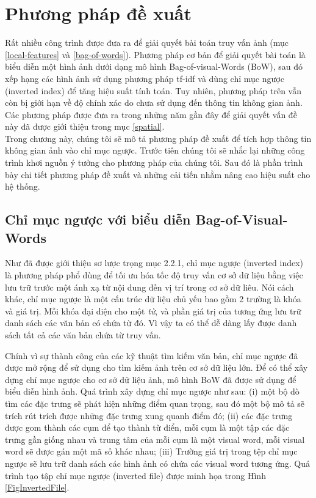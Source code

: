\chapter{Phương pháp đề xuất}
\label{chapter:proposed}
\ifpdf
    \graphicspath{{Chapter3/Chapter3Figs/PNG/}{Chapter3/Chapter3Figs/PDF/}{Chapter3/Chapter3Figs/}}
\else
    \graphicspath{{Chapter3/Chapter3Figs/EPS/}{Chapter3/Chapter3Figs/}}
\fi


Rất nhiều công trình được đưa ra để giải quyết bài toán truy vấn ảnh (mục \ref{local-features} và \ref{bag-of-words}). Phương pháp cơ bản để giải quyết bài toán là biểu diễn một hình ảnh dưới dạng mô hình Bag-of-visual-Words (BoW), sau đó xếp hạng các hình ảnh sử dụng phương pháp tf-idf và dùng chỉ mục ngược (inverted index) để tăng hiệu suất tính toán. Tuy nhiên, phương pháp trên vẫn còn bị giới hạn về độ chính xác do chưa sử dụng đến thông tin không gian ảnh. Các phương pháp được đưa ra trong những năm gần đây để giải quyết vấn đề này đã được giới thiệu trong mục \ref{spatial}.\\

Trong chương này, chúng tôi sẽ mô tả phương pháp đề xuất để tích hợp thông tin không gian ảnh vào chỉ mục ngược. Trước tiên chúng tôi sẽ nhắc lại những công trình khơi nguồn ý tưởng cho phương pháp của chúng tôi. Sau đó là phần trình bày chi tiết phương pháp đề xuất và những cải tiến nhằm nâng cao hiệu suất cho hệ thống.

\section{Chỉ mục ngược với biểu diễn Bag-of-Visual-Words}
\label{sec:inverted-index}
Như đã được giới thiệu sơ lược trọng mục 2.2.1, chỉ mục ngược (inverted index) là phương pháp phổ dùng để tối ưu hóa tốc độ truy vấn cơ sở dữ liệu bằng việc lưu trữ trước một ánh xạ từ nội dung đến vị trí trong cơ sở dữ liêu. Nói cách khác, chỉ mục ngược là một cấu trúc dữ liệu chủ yếu bao gồm 2 trường là khóa và giá trị. Mỗi khóa đại diện cho một \textit{từ}, và phần giá trị của tương ứng lưu trữ danh sách các văn bản có chứa từ đó. Vì vậy ta có thể dễ dàng lấy được danh sách tất cả các văn bản chứa từ truy vấn.

Chính vì sự thành công của các kỹ thuật tìm kiếm văn bản, chỉ mục ngược đã được mở rộng để sử dụng cho tìm kiếm ảnh trên cơ sở dữ liệu lớn. Để có thể xây dựng chỉ mục ngược cho cơ sở dữ liệu ảnh, mô hình BoW đã được sử dụng để biểu diễn hình ảnh. Quá trình xây dựng chỉ mục ngược như sau: (i) một bộ dò tìm các đặc trưng sẽ phát hiện những điểm quan trọng, sau đó một bộ mô tả sẽ trích rút trích được những đặc trưng xung quanh điểm đó; (ii) các đặc trưng được gom thành các cụm để tạo thành từ điển, mỗi cụm là một tập các đặc trưng gần giống nhau và trung tâm của mỗi cụm là một visual word, mỗi visual word sẽ được gán một mã số khác nhau; (iii) Trường giá trị trong tệp chỉ mục ngược sẽ lưu trữ danh sách các hình ảnh có chứa các visual word tương ứng. Quá trình tạo tập chỉ mục ngược (inverted file) được minh họa trong Hình \ref{FigInvertedFile}.

